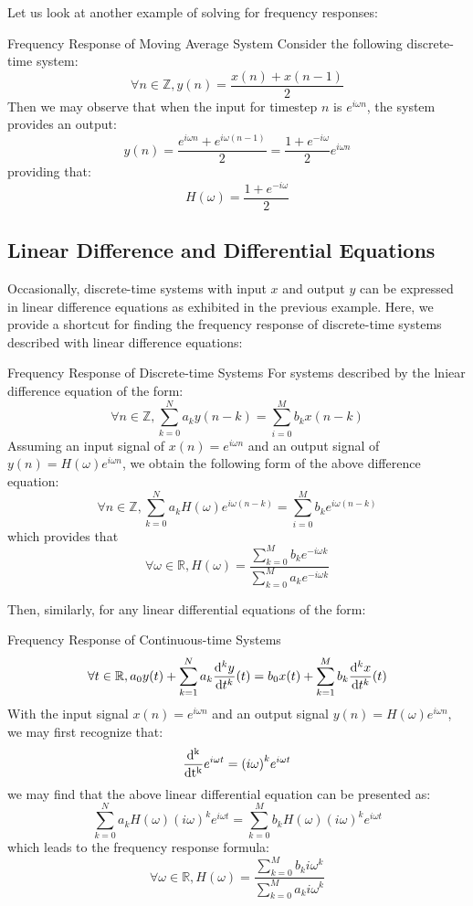 Let us look at another example of solving for frequency responses:
\begin{ln-example}{Frequency Response of Moving Average System}
    Consider the following discrete-time system:
    \[
        \forall n \in \mathbb{Z}, y(n) = \frac{x(n) + x(n - 1)}{2}
    \]
    Then we may observe that when the input for timestep $n$ is $e^{i \omega n}$, the system provides an output:
    \[
        y(n) = \frac{e^{i \omega n} + e^{i \omega (n - 1)}}{2} = \frac{1 + e^{-i \omega}}{2} e^{i \omega n}
    \]
    providing that:
    \[
        H(\omega) = \frac{1 + e^{-i \omega}}{2}
    \]
\end{ln-example}

\subsection{Linear Difference and Differential Equations}
Occasionally, discrete-time systems with input $x$ and output $y$ can be expressed in linear difference equations as exhibited in the previous example.
Here, we provide a shortcut for finding the frequency response of discrete-time systems described with linear difference equations:
\begin{ln-theorem}{Frequency Response of Discrete-time Systems}{}
    For systems described by the lniear difference equation of the form:
    \[
        \forall n \in \mathbb{Z}, \sum_{k = 0}^N a_k y(n - k) = \sum_{i = 0}^M b_k x(n - k)
    \]
    Assuming an input signal of $x(n) = e^{i \omega n}$ and an output signal of $y(n) = H(\omega) e^{i \omega n}$, we obtain the following form of the above difference equation:
    \[
        \forall n \in \mathbb{Z}, \sum_{k = 0}^N a_k H(\omega) e^{i \omega (n - k)} = \sum_{i = 0}^M b_k e^{i \omega (n - k)}
    \]
    which provides that
    \[
        \forall \omega \in \mathbb{R}, H(\omega) = \frac{\sum_{k = 0}^M b_k e^{-i \omega k}}{\sum_{k = 0}^M a_k e^{-i \omega k}}
    \]
\end{ln-theorem}

Then, similarly, for any linear differential equations of the form:
\begin{ln-theorem}{Frequency Response of Continuous-time Systems}{}
    \[
        \forall t \in \mathbb{R}, a_0 y(t) + \sum_{k=1}^N a_k \frac{{\rm d}^k y}{{\rm d} t^k} (t) = b_0 x(t) + \sum_{k=1}^M b_k \frac{{\rm d}^k x}{{\rm d} t^k} (t)
    \]
    With the input signal $x(n) = e^{i \omega n}$ and an output signal $y(n) = H(\omega) e^{i \omega n}$, we may first recognize that:
    \[
        \frac{\rm{d}^k}{\rm{d} t^k} e^{i \omega t} = {(i \omega)}^k e^{i \omega t}
    \]
    we may find that the above linear differential equation can be presented as:
    \[
        \sum_{k = 0}^N a_k H(\omega) {(i \omega)}^k e^{i \omega t} = \sum_{k = 0}^M b_k H(\omega) {(i \omega)}^k e^{i \omega t}
    \]
    which leads to the frequency response formula:
    \[
        \forall \omega \in \mathbb{R}, H(\omega) = \frac{\sum_{k = 0}^M b_k {i \omega}^k}{\sum_{k = 0}^M a_k {i \omega}^k}
    \]
\end{ln-theorem}

